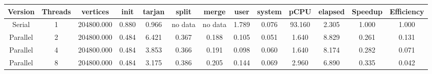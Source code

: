 \begin{tabular}{|c|c|c|c|c|c|c|c|c|c|c|c|c|}
\toprule
 Version &  Threads &   vertices &  init &  tarjan &   split &   merge &  user &  system &   pCPU &  elapsed &  Speedup &  Efficiency \\
\midrule
  Serial &        1 & 204800.000 & 0.880 &   0.966 & no data & no data & 1.789 &   0.076 & 93.160 &    2.305 &    1.000 &       1.000 \\
Parallel &        2 & 204800.000 & 0.484 &   6.421 &   0.367 &   0.188 & 0.105 &   0.051 &  1.640 &    8.829 &    0.261 &       0.131 \\
Parallel &        4 & 204800.000 & 0.484 &   3.853 &   0.366 &   0.191 & 0.098 &   0.060 &  1.640 &    8.174 &    0.282 &       0.071 \\
Parallel &        8 & 204800.000 & 0.484 &   3.175 &   0.386 &   0.205 & 0.144 &   0.069 &  2.960 &    6.890 &    0.335 &       0.042 \\
\bottomrule
\end{tabular}
